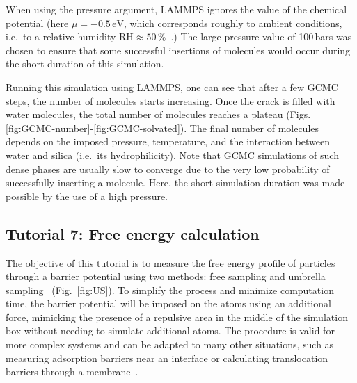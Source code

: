 \documentclass[9pt,tutorial]{livecoms}
\begin{document}
\begin{note}
  When using the pressure argument, LAMMPS ignores the value of the
  chemical potential (here $\mu = -0.5\,\text{eV}$, which corresponds roughly to
  ambient conditions, i.e.~to a relative humidity $\text{RH} \approx 50\,\%$~\cite{gravelle2020multi}.)
  The large pressure value of 100\,bars was chosen to ensure that some successful
  insertions of molecules would occur during the short duration of this simulation.
\end{note}

Running this simulation using LAMMPS, one can see that
after a few GCMC steps, the number of molecules starts increasing.  Once the
crack is filled with water molecules, the total number of molecules reaches a plateau
(Figs.\,\ref{fig:GCMC-number}-\ref{fig:GCMC-solvated}).  The final number of
molecules depends on the imposed pressure, temperature, and the interaction
between water and silica (i.e.~its hydrophilicity).  Note that GCMC simulations
of such dense phases are usually slow to converge due to the very low probability
of successfully inserting a molecule.  Here, the short simulation duration was
made possible by the use of a high pressure.

\subsection{Tutorial 7: Free energy calculation}
\label{umbrella-sampling-label}

The objective of this tutorial is to measure the free energy profile of
particles through a barrier potential using two methods: free sampling
and umbrella sampling~\cite{kastner2011umbrella, allen2017computer,
  frenkel2023understanding} (Fig.~\ref{fig:US}).  To simplify the
process and minimize computation time, the barrier potential will be
imposed on the atoms using an additional force, mimicking the presence
of a repulsive area in the middle of the simulation box without needing
to simulate additional atoms.  The procedure is valid for more complex
systems and can be adapted to many other situations, such as measuring
adsorption barriers near an interface or calculating translocation
barriers through a membrane~\cite{wilson1997adsorption,
  makarov2009computer, gravelle2021adsorption, loche2022molecular,
  hayatifar2024probing}.
\end{document}
